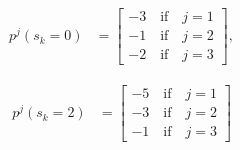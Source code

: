\begin{Ex}\label{ex1}
 \begin{align*}
    p^{j}(s_k=0) &= \begin{bmatrix}
           -3\quad \text{if} \quad j=1 \\
           -1\quad \text{if} \quad j=2\\
           -2\quad  \text{if} \quad  j=3
         \end{bmatrix},
  \end{align*} 
  
  \quad
  
  \begin{align*}
    p^{j}(s_k=2) &= \begin{bmatrix}
           -5\quad \text{if} \quad j=1 \\
           -3\quad \text{if} \quad j=2\\
           -1\quad  \text{if} \quad  j=3
         \end{bmatrix}
  \end{align*} 
  
\end{Ex}





%

